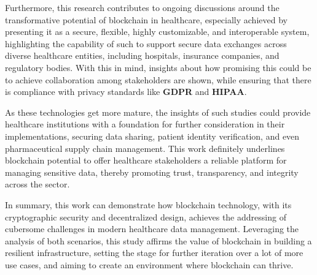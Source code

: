 Furthermore, this research contributes to ongoing discussions around the transformative potential of blockchain in healthcare, especially achieved by presenting it as a secure, flexible, highly customizable, and interoperable system, highlighting the capability of such to support secure data exchanges across diverse healthcare entities, including hospitals, insurance companies, and regulatory bodies. With this in mind, insights about how promising this could be to achieve collaboration among stakeholders are shown, while ensuring that there is compliance with privacy standards like \textbf{GDPR} and \textbf{HIPAA}.

As these technologies get more mature, the insights of such studies could provide healthcare institutions with a foundation for further consideration in their implementations, securing data sharing, patient identity verification, and even pharmaceutical supply chain management. This work definitely underlines blockchain potential to offer healthcare stakeholders a reliable platform for managing sensitive data, thereby promoting trust, transparency, and integrity across the sector.

In summary, this work can demonstrate how blockchain technology, with its cryptographic security and decentralized design, achieves the addressing of cubersome challenges in modern healthcare data management. Leveraging the analysis of both scenarios, this study affirms the value of blockchain in building a resilient infrastructure, setting the stage for further iteration over a lot of more use cases, and aiming to create an environment where blockchain can thrive.
